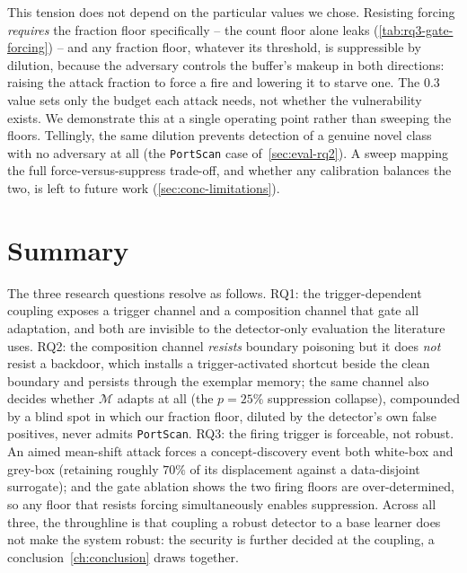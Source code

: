 This tension does not depend on the particular values we chose. Resisting forcing \emph{requires} the fraction floor specifically -- the count floor alone leaks (\cref{tab:rq3-gate-forcing}) -- and any fraction floor, whatever its threshold, is suppressible by dilution, because the adversary controls the buffer's makeup in both directions: raising the attack fraction to force a fire and lowering it to starve one. The $0.3$ value sets only the budget each attack needs, not whether the vulnerability exists. We demonstrate this at a single operating point rather than sweeping the floors. Tellingly, the same dilution prevents detection of a genuine novel class with no adversary at all (the \texttt{PortScan} case of~\cref{sec:eval-rq2}). A sweep mapping the full force-versus-suppress trade-off, and whether any calibration balances the two, is left to future work (\cref{sec:conc-limitations}).

\section{Summary}
\label{sec:eval-summary}
The three research questions resolve as follows. RQ1: the trigger-dependent coupling exposes a trigger channel and a composition channel that gate all adaptation, and both are invisible to the detector-only evaluation the literature uses. RQ2: the composition channel \emph{resists} boundary poisoning but it does \emph{not} resist a backdoor, which installs a trigger-activated shortcut beside the clean boundary and persists through the exemplar memory; the same channel also decides whether $\mathcal{M}$ adapts at all (the $p = 25\%$ suppression collapse), compounded by a blind spot in which our fraction floor, diluted by the detector's own false positives, never admits \texttt{PortScan}. RQ3: the firing trigger is forceable, not robust. An aimed mean-shift attack forces a concept-discovery event both white-box and grey-box (retaining roughly $70\%$ of its displacement against a data-disjoint surrogate); and the gate ablation shows the two firing floors are over-determined, so any floor that resists forcing simultaneously enables suppression. Across all three, the throughline is that coupling a robust detector to a base learner does not make the system robust: the security is further decided at the coupling, a conclusion~\cref{ch:conclusion} draws together.


